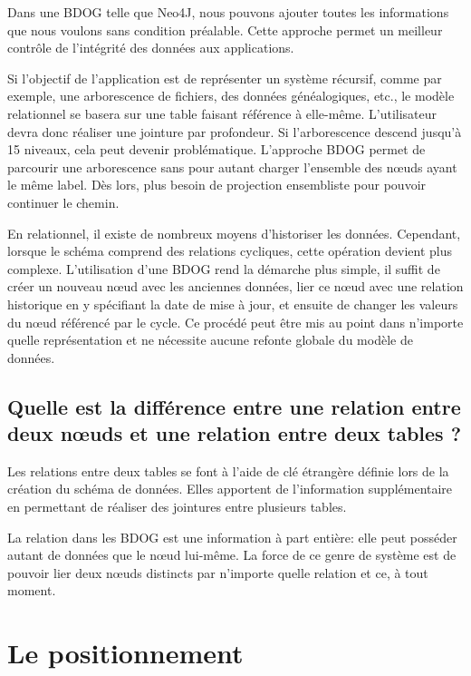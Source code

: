 \documentclass[a4paper,fleqn,12pt,oneside]{report}
\begin{document}
Dans une BDOG telle que Neo4J, nous pouvons ajouter toutes les informations que nous voulons sans condition préalable. Cette approche permet un meilleur contrôle de l’intégrité des données aux applications.

Si l’objectif de l’application est de représenter un système récursif, comme par exemple, une arborescence de fichiers, des données généalogiques, etc., le modèle relationnel se basera sur une table faisant référence à elle-même. L’utilisateur devra donc réaliser une jointure par profondeur. Si l’arborescence descend jusqu’à 15 niveaux, cela peut devenir problématique\cite{miller2013graph}. L’approche BDOG permet de parcourir une arborescence sans pour autant charger l’ensemble des nœuds ayant le même label. Dès lors, plus besoin de projection ensembliste pour pouvoir continuer le chemin.

En relationnel, il existe de nombreux moyens d’historiser les données. Cependant, lorsque le schéma comprend des relations cycliques, cette opération devient plus complexe. L’utilisation d’une BDOG rend la démarche plus simple, il suffit de créer un nouveau nœud avec les anciennes données, lier ce nœud avec une relation historique en y spécifiant la date de mise à jour, et ensuite de changer les valeurs du nœud référencé par le cycle. Ce procédé peut être mis au point dans n’importe quelle représentation et ne nécessite aucune refonte globale du modèle de données\cite{NoSQLVsSGBDR}\label{noSqlVSRel}.

\subsection*{Quelle est la différence entre une relation entre deux nœuds et une relation entre deux tables ?}
Les relations entre deux tables se font à l’aide de clé étrangère définie lors de la création du schéma de données. Elles apportent de l’information supplémentaire en permettant de réaliser des jointures entre plusieurs tables.

La relation dans les BDOG est une information à part entière: elle peut posséder autant de données que le nœud lui-même.  La force de ce genre de système est de pouvoir lier deux nœuds distincts par n’importe quelle relation et ce, à tout moment\cite{NoSQLVsSGBDR}.

\section{Le positionnement}
\end{document}
